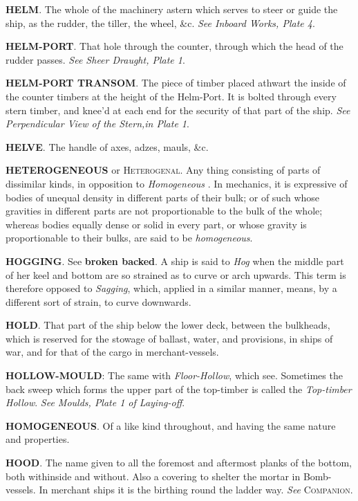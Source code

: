 \textbf{HELM}. The whole of the machinery astern which serves to steer or guide the ship, as the rudder, the tiller, the wheel, \&c. \textit{See Inboard Works, Plate 4}. 

\textbf{HELM-PORT}. That hole through the counter, through which the head of the rudder passes. \textit{See Sheer Draught, Plate 1}. 

\textbf{HELM-PORT TRANSOM}. The piece of timber placed athwart the inside of the counter timbers at the height of the Helm-Port. It is bolted through every stern timber, and knee'd at each end for the security of that part of the ship. \textit{See Perpendicular View of the Stern,in Plate 1}. 

\textbf{HELVE}. The handle of axes, adzes, mauls, \&c. 

\textbf{HETEROGENEOUS} or \textsc{Heterogenal}. Any thing consisting of parts of dissimilar kinds, in opposition to \textit{Homogeneous} . In mechanics, it is expressive of bodies of unequal density in different parts of their bulk; or of such whose gravities in different parts are not proportionable to the bulk of the whole; whereas bodies equally dense or solid in every part, or whose gravity is proportionable to their bulks, are said to be \textit{homogeneous}. 

\textbf{HOGGING}. See \textbf{broken backed}. A ship is said to \textit{Hog} when the middle part of her keel and bottom are so strained as to curve or arch upwards. This term is therefore opposed to \textit{Sagging}, which, applied in a similar manner, means, by a different sort of strain, to curve downwards. 

\textbf{HOLD}. That part of the ship below the lower deck, between the bulkheads, which is reserved for the stowage of ballast, water, and provisions, in ships of war, and for that of the cargo in merchant-vessels. 

\textbf{HOLLOW-MOULD}: The same with \textit{Floor-Hollow}, which see. Sometimes the back sweep which forms the upper part of the top-timber is called the \textit{Top-timber Hollow}. \textit{See Moulds, Plate 1 of Laying-off}. 

\textbf{HOMOGENEOUS}. Of a like kind throughout, and having the same nature and properties. 

\textbf{HOOD}. The name given to all the foremost and aftermost planks of the bottom, both withinside and without. Also a covering to shelter the mortar in Bomb-vessels. In merchant ships it is the birthing round the ladder way. \textit{See} \textsc{Companion}. 

